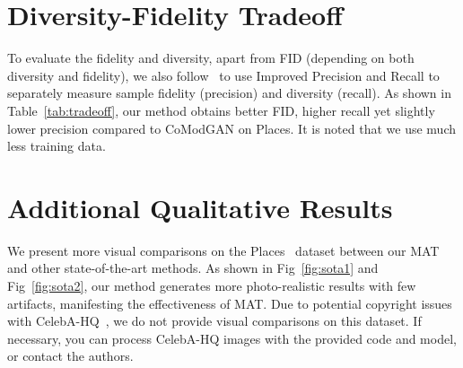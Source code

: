 \documentclass[10pt,twocolumn,letterpaper]{article}
\begin{document}
	\section{Diversity-Fidelity Tradeoff}
	To evaluate the fidelity and diversity, apart from FID (depending on both diversity and fidelity), we also follow~\cite{kynkaanniemi2019improved,dhariwal2021diffusion} to use Improved Precision and Recall to separately measure sample fidelity (precision) and diversity (recall). As shown in Table~\ref{tab:tradeoff}, our method obtains better FID, higher recall yet slightly lower precision compared to CoModGAN on Places. It is noted that we use much less training data.
	
	\begin{table}[t]
		\small
		\centering
		\caption{Precision and Recall results of our MAT and CoModGAN on Places.}
		\label{tab:tradeoff}
\end{table}
	




	\section{Additional Qualitative Results}
	\label{sec:visual}
	
	We present more visual comparisons on the Places~\cite{zhou2017places} dataset between our MAT and other state-of-the-art methods. As shown in Fig~\ref{fig:sota1} and Fig~\ref{fig:sota2}, our method generates more photo-realistic results with few artifacts, manifesting the effectiveness of MAT. Due to potential copyright issues with CelebA-HQ~\cite{karras2018progressive}, we do not provide visual comparisons on this dataset. If necessary, you can process CelebA-HQ images with the provided code and model, or contact the authors. 
	
\end{document}

